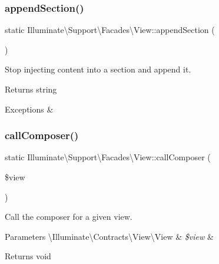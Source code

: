 \subsubsection{\texorpdfstring{append\+Section()}{appendSection()}}
{\footnotesize\ttfamily static Illuminate\textbackslash{}\+Support\textbackslash{}\+Facades\textbackslash{}\+View\+::append\+Section (\begin{DoxyParamCaption}{ }\end{DoxyParamCaption})\hspace{0.3cm}{\ttfamily [static]}}

Stop injecting content into a section and append it.

\begin{DoxyReturn}{Returns}
string 
\end{DoxyReturn}

\begin{DoxyExceptions}{Exceptions}
{\em } & \\
\hline
\end{DoxyExceptions}
\mbox{\label{class_illuminate_1_1_support_1_1_facades_1_1_view_a7639d4555e9d25ea8d0a08a5f5fbdfaa}} 
\subsubsection{\texorpdfstring{call\+Composer()}{callComposer()}}
{\footnotesize\ttfamily static Illuminate\textbackslash{}\+Support\textbackslash{}\+Facades\textbackslash{}\+View\+::call\+Composer (\begin{DoxyParamCaption}\item[{}]{\$view }\end{DoxyParamCaption})\hspace{0.3cm}{\ttfamily [static]}}

Call the composer for a given view.


\begin{DoxyParams}[1]{Parameters}
\textbackslash{}\+Illuminate\textbackslash{}\+Contracts\textbackslash{}\+View\textbackslash{}\+View & {\em \$view} & \\
\hline
\end{DoxyParams}
\begin{DoxyReturn}{Returns}
void 
\end{DoxyReturn}
\mbox{\label{class_illuminate_1_1_support_1_1_facades_1_1_view_aded447db3cf7072659a0446830b02711}} 
